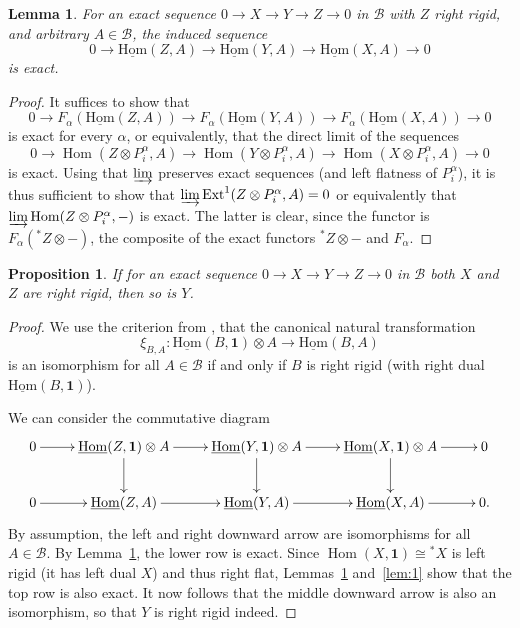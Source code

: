 \documentclass[11pt]{amsart}
\def\Hom{\operatorname{Hom}}
\newcommand{\uHom}{\underline{\mathrm{Hom}}}
\def\Ext{\mathrm{Ext}}
\def\cB{\mathscr{B}}
\newtheorem{lemma}[thm]{Lemma}
\newtheorem{prop}[thm]{Proposition}
\theoremstyle{definition}
\theoremstyle{remark}
\numberwithin{equation}{section}
\newcommand{\unit}{\mathbf{1}}
\begin{document}
\begin{lemma}\label{lem:2}
    For an exact sequence $0\to X\to Y\to Z\to 0$ in $\cB$ with $Z$ right rigid, and arbitrary $A\in\cB$, the induced sequence
    \[0\to \uHom(Z,A)\to \uHom(Y,A)\to\uHom(X,A)\to 0\]
    is exact.
\end{lemma}
\begin{proof}


    It suffices to show that
    \[0\to F_\alpha(\uHom(Z,A))\to F_\alpha(\uHom(Y,A))\to F_\alpha(\uHom(X,A))\to 0 \]
    is exact for every $\alpha$, or equivalently, that the direct limit of the sequences
    \[0\to \Hom(Z\otimes P_i^\alpha,A)\to \Hom(Y\otimes P_i^\alpha,A)\to\Hom(X\otimes P_i^\alpha,A)\to 0\]
    is exact.  Using that $\varinjlim$ preserves exact sequences (and left flatness of $P_i^\alpha$), it is thus sufficient to show that 
    $\varinjlim \Ext^1(Z\otimes P_i^\alpha, A)=0$ or equivalently that $\varinjlim \Hom(Z\otimes P_i^\alpha,-)$ is exact. The latter is clear, since the functor is $F_\alpha({}^\ast Z\otimes -)$, the composite of the exact functors ${}^\ast Z\otimes-$ and $F_\alpha$.
\end{proof}

\begin{prop}\label{prop:C}
  If for an exact sequence $0\to X\to Y\to Z\to 0$ in $\cB$ both $X$ and $Z$ are right rigid, then so is $Y$.
\end{prop}
\begin{proof}
    We use the criterion from \cite[Proposition~2.3]{Del90}, that the canonical natural transformation
    \[\xi_{B,A}:\uHom(B,\unit)\otimes A\to\uHom(B,A)\]
    is an isomorphism for all $A\in\cB$ if and only if $B$ is right rigid (with right dual $\uHom(B,\unit)$).

    We can consider the commutative diagram
    \[\xymatrix{
    0\ar[r]&\uHom(Z,\unit)\otimes A\ar[r]\ar[d]&\uHom(Y,\unit)\otimes A\ar[r]\ar[d]& \uHom(X,\unit)\otimes A\ar[r]\ar[d]&0 \\ 
    0\ar[r]&\uHom(Z,A)\ar[r]&\uHom(Y,A)\ar[r] &\uHom(X,A)\ar[r]&0 .}\]
By assumption, the left and right downward arrow are isomorphisms for all $A\in\cB$. By Lemma~\ref{lem:2}, the lower row is exact. Since $\Hom(X,\unit)\cong {}^\ast X$ is left rigid (it has left dual $X$) and thus right flat, Lemmas~\ref{lem:2} and~\ref{lem:1} show that the top row is also exact. It now follows that the middle downward arrow is also an isomorphism, so that $Y$ is right rigid indeed.
\end{proof}
\end{document}
